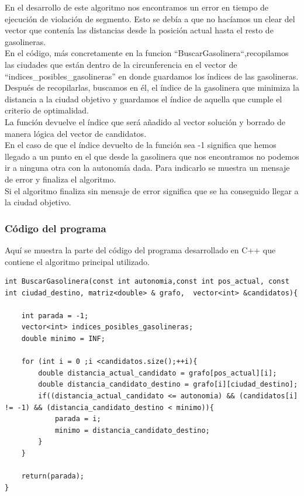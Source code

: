 \documentclass[11pt,a4paper]{article} %
\begin{document}
En el desarrollo de este algoritmo nos encontramos un error en tiempo de ejecución de violación de segmento. Esto se debía a que no hacíamos un clear del vector que contenía las distancias desde la posición actual hasta el resto de gasolineras.\\

En el código, más concretamente en la funcion “BuscarGasolinera“,recopilamos las ciudades que están dentro de la circunferencia en el vector de “indices\_posibles\_gasolineras” en donde guardamos los índices de las gasolineras.\\

Después de recopilarlas, buscamos en él, el índice de la gasolinera que minimiza la distancia a la ciudad objetivo y guardamos el índice de aquella que cumple el criterio de optimalidad.\\

La función devuelve el índice que será añadido al vector solución y borrado de manera lógica del vector de candidatos.\\

En el caso de que el índice devuelto de la función sea -1 significa que hemos llegado a un punto en el que desde la gasolinera que nos encontramos no podemos ir a ninguna otra con la autonomía dada. Para indicarlo se muestra un mensaje de error y finaliza el algoritmo.\\

Si el algoritmo finaliza sin mensaje de error significa que se ha conseguido llegar a la ciudad objetivo.\\

\subsubsection{Código del programa}
Aquí se muestra la parte del código del programa desarrollado en C++ que contiene el algoritmo principal utilizado.

\begin{lstlisting}[style=C++]
int BuscarGasolinera(const int autonomia,const int pos_actual, const int ciudad_destino, matriz<double> & grafo,  vector<int> &candidatos){

	int parada = -1;
	vector<int> indices_posibles_gasolineras;
	double minimo = INF;
	
	for (int i = 0 ;i <candidatos.size();++i){
		double distancia_actual_candidato = grafo[pos_actual][i];
		double distancia_candidato_destino = grafo[i][ciudad_destino];
		if((distancia_actual_candidato <= autonomia) && (candidatos[i] != -1) && (distancia_candidato_destino < minimo)){
			parada = i;
			minimo = distancia_candidato_destino;
		}
	}
	
	return(parada);
}
\end{lstlisting}
\end{document}
